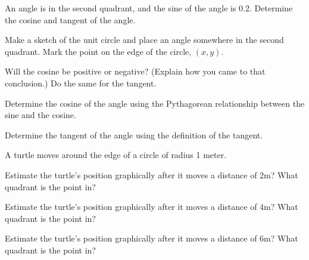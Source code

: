 \begin{problem}
  \item An angle is in the second quadrant, and the sine of the angle is 0.2.
    Determine the cosine and tangent of the angle.
  \begin{subproblem}
    \item Make a sketch of the unit circle and place an angle somewhere in the second quadrant.
    Mark the point on the edge of the circle, $(x,y)$.
    \vfill

    \item Will the cosine be positive or negative? (Explain how you came to that conclusion.)
      Do the same for the tangent.
      \vfill

    \item Determine the cosine of the angle using the Pythagorean relationship between the sine
        and the cosine.
        \vfill

    \item Determine the tangent of the angle using the definition of the tangent.
      \vfill
  \end{subproblem}

  \clearpage

  \item A turtle moves around the edge of a circle of radius 1 meter.
  \begin{subproblem}
  \item Estimate the turtle's position graphically after it moves a
    distance of 2m?  What quadrant is the point in?

    \vfill
    
  \item Estimate the turtle's position graphically after it moves a
    distance of 4m?  What quadrant is the point in?
    \vfill
  \item Estimate the turtle's position graphically after it moves a
    distance of 6m?  What quadrant is the point in?
    \vfill
  \end{subproblem}

  \clearpage


\end{problem}
